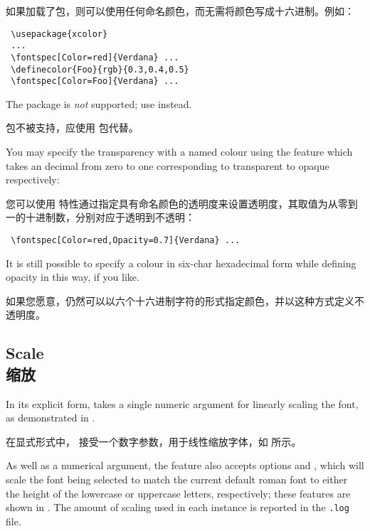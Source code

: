 \documentclass[a4paper]{l3doc}
\begin{document}
如果加载了包，则可以使用任何命名颜色，而无需将颜色写成十六进制。例如：

\begin{Verbatim}
 \usepackage{xcolor}
 ...
 \fontspec[Color=red]{Verdana} ...
 \definecolor{Foo}{rgb}{0.3,0.4,0.5}
 \fontspec[Color=Foo]{Verdana} ...
\end{Verbatim}
The  package is \emph{not} supported; use  instead.

 包不被支持，应使用  包代替。

You may specify the transparency with a named colour using the 
feature which takes an decimal from zero to one corresponding to
transparent to opaque respectively:

您可以使用  特性通过指定具有命名颜色的透明度来设置透明度，其取值为从零到一的十进制数，分别对应于透明到不透明：

\begin{Verbatim}
 \fontspec[Color=red,Opacity=0.7]{Verdana} ...
\end{Verbatim}
It is still possible to specify a colour in six-char hexadecimal form
while defining opacity in this way, if you like.

如果您愿意，仍然可以以六个十六进制字符的形式指定颜色，并以这种方式定义不透明度。

\subsection{Scale\\缩放}


In its explicit form,  takes a single
numeric argument for linearly scaling the font, as demonstrated
in .

在显式形式中， 接受一个数字参数，用于线性缩放字体，如  所示。

As well as a numerical argument, the  feature
also accepts options 
and , which will scale the font being selected to match
the current default roman font to either the height of the lowercase or
uppercase letters, respectively; these features are shown in .
The amount of scaling used in each instance is reported in the \texttt{.log} file.
\end{document}
